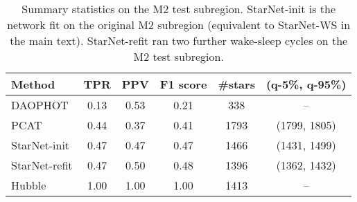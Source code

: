 \begin{table}[ht]
\centering
\caption{Summary statistics on the M2 test subregion. 
StarNet-init is the network fit on the original M2 subregion (equivalent to StarNet-WS in the main text). 
StarNet-refit ran two further wake-sleep cycles on the M2 test subregion. }
\label{tab:summary_stats_m2test}
\begin{tabular}{l|ccc|cc}
\toprule
     Method &   TPR &   PPV &  F1 score &  \#stars & (q-5\%, q-95\%)\\
\midrule
    DAOPHOT &  0.13 &  0.53 &      0.21 &     338 & -- \\
       PCAT &  0.44 &  0.37 &      0.41 &    1793 & (1799, 1805)\\
 StarNet-init &  0.47 &  0.47 &      0.47 &    1466 & (1431, 1499)\\
 StarNet-refit &  0.47 &  0.50 &      0.48 &     1396 & (1362, 1432)\\
     Hubble &  1.00 &  1.00 &      1.00 &     1413 & -- \\
\bottomrule
\end{tabular}
\end{table}
